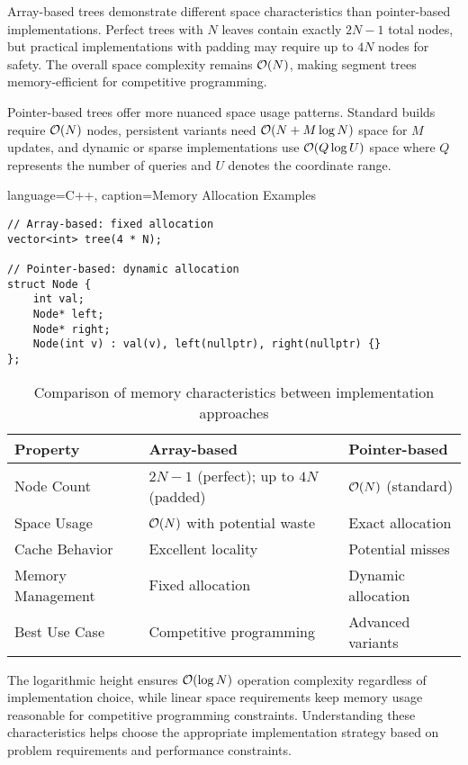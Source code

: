 Array-based trees demonstrate different space characteristics than pointer-based implementations. Perfect trees with $N$ leaves contain exactly $2N-1$ total nodes, but practical implementations with padding may require up to $4N$ nodes for safety. The overall space complexity remains $\mathcal{O}(N)$, making segment trees memory-efficient for competitive programming.

Pointer-based trees offer more nuanced space usage patterns. Standard builds require $\mathcal{O}(N)$ nodes, persistent variants need $\mathcal{O}(N + M \log N)$ space for $M$ updates, and dynamic or sparse implementations use $\mathcal{O}(Q \log U)$ space where $Q$ represents the number of queries and $U$ denotes the coordinate range.

\begin{marginlisting}[0pt]{language=C++, caption=Memory Allocation Examples}
\begin{lstlisting}
// Array-based: fixed allocation
vector<int> tree(4 * N);

// Pointer-based: dynamic allocation
struct Node {
    int val;
    Node* left;
    Node* right;
    Node(int v) : val(v), left(nullptr), right(nullptr) {}
};
\end{lstlisting}
\end{marginlisting}

\begin{table}
\footnotesize
\begin{tabular}{@{}lll@{}}
\toprule
\textbf{Property} & \textbf{Array-based} & \textbf{Pointer-based} \\
\midrule
Node Count & $2N-1$ (perfect); up to $4N$ (padded) & $\mathcal{O}(N)$ (standard) \\
Space Usage & $\mathcal{O}(N)$ with potential waste & Exact allocation \\
Cache Behavior & Excellent locality & Potential misses \\
Memory Management & Fixed allocation & Dynamic allocation \\
Best Use Case & Competitive programming & Advanced variants \\
\bottomrule
\end{tabular}
\caption{Comparison of memory characteristics between implementation approaches}
\end{table}

The logarithmic height ensures $\mathcal{O}(\log N)$ operation complexity regardless of implementation choice, while linear space requirements keep memory usage reasonable for competitive programming constraints. Understanding these characteristics helps choose the appropriate implementation strategy based on problem requirements and performance constraints.

